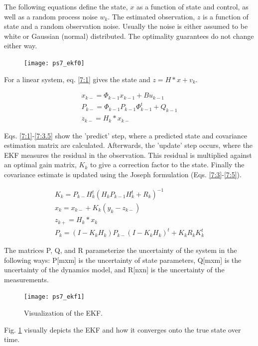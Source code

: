 \documentclass[12pt, letterpaper]{article}
\begin{document}
The following equations define the state, $x$ as a function of state and control, as well as a random process noise $w_k$. The estimated observation, $z$ is a function of state and a random observation noise. Usually the noise is either assumed to be white or Gaussian (normal) distributed. The optimality guarantees do not change either way.

\begin{figure}[H]
	\centering
	\texttt{[image: ps7\_ekf0]}
\end{figure}

For a linear system, eq. \ref{7:1} gives the state and $z=H*x+v_k$.


\begin{gather}
x_{k-}=\Phi_{k-1}x_{k-1}+Bu_{k-1} \label{7:1}\\
P_{k-}=\Phi_{k-1}P_{k-1}\Phi_{k-1}^t+Q_{k-1} \label{7:2} \\
z_{k-}=H_k*x_{k-} \label{7:3.5} 
\end{gather}

Eqs. \ref{7:1}-\ref{7:3.5} show the 'predict' step, where a predicted state and covariance estimation matrix are calculated. Afterwards, the 'update' step occurs, where the EKF measures the residual in the observation. This residual is multiplied against an optimal gain matrix, $K_k$ to give a correction factor to the state. Finally the covariance estimate is updated using the Joseph formulation (Eqs. \ref{7:3}-\ref{7:5}).

\begin{gather}
K_k=P_{k-}H_k^t(H_kP_{k-1}H_k^t+R_k)^{-1} \label{7:3} \\
x_k=x_{k-}+K_k(y_k-z_{k-}) \label{7:4} \\
z_{k+}=H_k*x_k \label{7:4.5} \\
P_k=(I-K_kH_k)P_{k-}(I-K_kH_k)^t+K_kR_kK_k^t \label{7:5}
\end{gather}

The matrices P, Q, and R parameterize the uncertainty of the system in the following ways: P[mxm] is the uncertainty of state parameters, Q[mxm] is the uncertainty of the dynamics model, and R[nxn] is the uncertainty of the measurements.

\begin{figure}[H]
	\centering
	\texttt{[image: ps7\_ekf1]}
	\caption{Visualization of the EKF.}
	\label{7:ekf1}
\end{figure}

Fig. \ref{7:ekf1} visually depicts the EKF and how it converges onto the true state over time.
\end{document}
